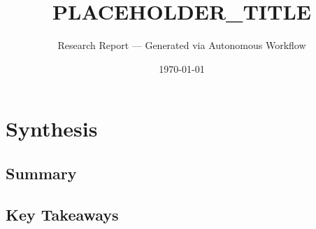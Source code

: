 \documentclass[11pt]{article}
\title{PLACEHOLDER_TITLE}
\author{Research Report --- Generated via Autonomous Workflow}
\date{\today}
\begin{document}
\maketitle
\tableofcontents
\newpage


\section{Synthesis}
%

\subsection{Summary}

\subsection{Key Takeaways}
\end{document}
